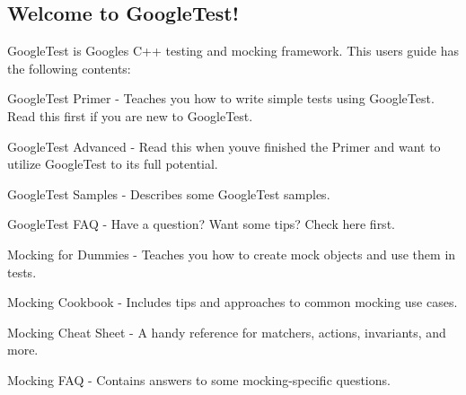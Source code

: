 \subsection*{Welcome to Google\+Test!}

Google\+Test is Google\textquotesingle{}s C++ testing and mocking framework. This user\textquotesingle{}s guide has the following contents\+:


\begin{DoxyItemize}
\item Google\+Test Primer -\/ Teaches you how to write simple tests using Google\+Test. Read this first if you are new to Google\+Test.
\item Google\+Test Advanced -\/ Read this when you\textquotesingle{}ve finished the Primer and want to utilize Google\+Test to its full potential.
\item Google\+Test Samples -\/ Describes some Google\+Test samples.
\item Google\+Test F\+AQ -\/ Have a question? Want some tips? Check here first.
\item Mocking for Dummies -\/ Teaches you how to create mock objects and use them in tests.
\item Mocking Cookbook -\/ Includes tips and approaches to common mocking use cases.
\item Mocking Cheat Sheet -\/ A handy reference for matchers, actions, invariants, and more.
\item Mocking F\+AQ -\/ Contains answers to some mocking-\/specific questions. 
\end{DoxyItemize}